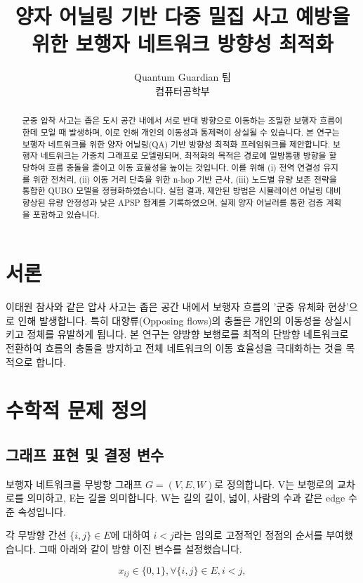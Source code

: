 \documentclass[11pt,a4paper]{article}
\title{양자 어닐링 기반 다중 밀집 사고 예방을 위한 보행자 네트워크 방향성 최적화}
\author{
    Quantum Guardian 팀\\
    컴퓨터공학부
}
\begin{document}
\maketitle

\begin{abstract}
군중 압착 사고는 좁은 도시 공간 내에서 서로 반대 방향으로 이동하는 조밀한 보행자 흐름이 한데 모일 때 발생하며, 이로 인해 개인의 이동성과 통제력이 상실될 수 있습니다. 본 연구는 보행자 네트워크를 위한 양자 어닐링(QA) 기반 방향성 최적화 프레임워크를 제안합니다. 보행자 네트워크는 가중치 그래프로 모델링되며, 최적화의 목적은 경로에 일방통행 방향을 할당하여 흐름 충돌을 줄이고 이동 효율성을 높이는 것입니다. 이를 위해 (i) 전역 연결성 유지를 위한 전처리, (ii) 이동 거리 단축을 위한 n-hop 기반 근사, (iii) 노드별 유량 보존 전략을 통합한 QUBO 모델을 정형화하였습니다. 실험 결과, 제안된 방법은 시뮬레이션 어닐링 대비 향상된 유량 안정성과 낮은 APSP 합계를 기록하였으며, 실제 양자 어닐러를 통한 검증 계획을 포함하고 있습니다.
\end{abstract}

\section{서론}
이태원 참사와 같은 압사 사고는 좁은 공간 내에서 보행자 흐름의 '군중 유체화 현상'으로 인해 발생합니다. 특히 대향류(Opposing flows)의 충돌은 개인의 이동성을 상실시키고 정체를 유발하게 됩니다. 본 연구는 양방향 보행로를 최적의 단방향 네트워크로 전환하여 흐름의 충돌을 방지하고 전체 네트워크의 이동 효율성을 극대화하는 것을 목적으로 합니다.

\section{수학적 문제 정의}

\subsection{그래프 표현 및 결정 변수}
보행자 네트워크를 무방향 그래프 $G = (V, E, W)$로 정의합니다. V는 보행로의 교차로를 의미하고, E는 길을 의미합니다. W는 길의 길이, 넓이, 사람의 수과 같은 edge 수준 속성입니다.

각 무방향 간선 $\{i, j\} \in E$에 대하여 $i < j$라는 임의로 고정적인 정점의 순서를 부여했습니다. 그때 아래와 같이 방향 이진 변수를 설정했습니다.

\begin{equation}
x_{ij} \in \{0, 1\},   \forall \{i, j\} \in E,  i < j,
\end{equation}
\end{document}
